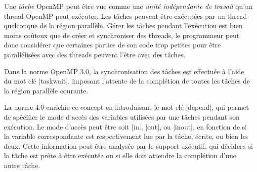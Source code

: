 \documentclass[parallelisme]{compas2016}
\begin{document}
Une \emph{tâche} OpenMP peut être vue comme une \emph{unité indépendante de travail} qu'un thread
OpenMP peut exécuter. Les tâches peuvent être exécutées par un thread quelconque
de la région parallèle.
Gérer les tâches pendant l'exécution est bien moins coûteux que de créer et synchroniser
des threads, le programmeur peut donc considérer que certaines parties de son code
trop petites pour être parallélisées avec des threads peuvent l'être avec des tâches.

Dans la norme OpenMP 3.0, la synchronisation des tâches est effectuée à l'aide du
mot clé |taskwait|, imposant l'attente de la complétion de toutes les tâches
de la région parallèle courante.

La norme 4.0 enrichie ce concept en introduisant le mot clé |depend|, qui permet
de spécifier le mode d'accès des variables utilisées par une tâches pendant son exécution.
Le mode d'accès peut être soit |in|, |out|, ou |inout|, en fonction de si la
variable correspondante est respectivement lue par la tâche, écrite, ou bien les deux.
Cette information peut être analysée par le support exécutif, qui décidera si
la tâche est prête à être exécutée ou si elle doit attendre la complétion d'une
autre tâche.




\end{document}
